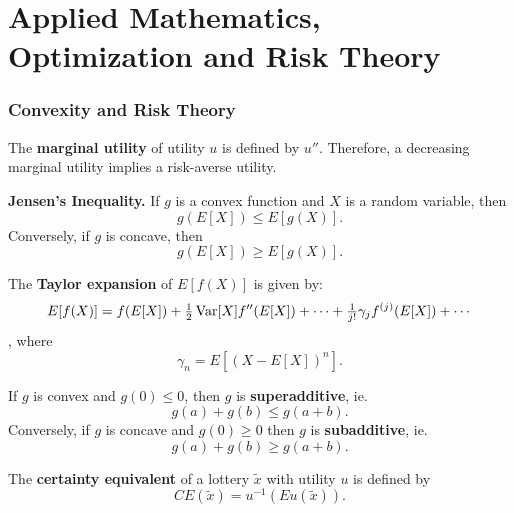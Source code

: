 \part{Applied Mathematics, Optimization and Risk Theory}

\section{Convexity and Risk Theory}
\begin{outline}
\1 The \textbf{marginal utility} of utility $u$ is defined by $u''$. Therefore, a
decreasing marginal utility implies a risk-averse utility.

\1 \textbf{Jensen's Inequality.} If $g$ is a convex function and $X$ is a
random variable, then
\begin{equation*}
  g(E[X]) \leq E[g(X)].
\end{equation*}
Conversely, if $g$ is concave, then
\begin{equation*}
  g(E[X]) \geq E[g(X)].
\end{equation*}

\1 The \textbf{Taylor expansion} of $E[f(X)]$ is given by:
\begin{equation*}
  E[f(X)] = f(E[X])+ \tfrac{1}{2}\operatorname{Var}[X]f''(E[X]) + \cdots + \tfrac{1}{j!}\gamma_jf^{(j)}(E[X])
  + \cdots
\end{equation*},
where
\begin{equation*}
  \gamma_n = E[(X-E[X])^n].
\end{equation*}


\1 If $g$ is convex and $g(0)\leq0$, then $g$ is \textbf{superadditive}, ie.
\begin{equation*}
  g(a) + g(b) \leq g(a+b).
\end{equation*}
Conversely, if $g$ is concave and $g(0)\geq 0$ then $g$ is \textbf{subadditive}, ie. 
\begin{equation*}
  g(a) + g(b) \geq g(a+b).
\end{equation*}

\1 The \textbf{certainty equivalent} of a lottery $\tilde x$ with utility $u$ is defined by
\begin{equation*}
  CE(\tilde x) = u^{-1}(Eu(\tilde x)).
\end{equation*}

\end{outline}


